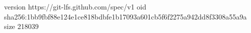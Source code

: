 version https://git-lfs.github.com/spec/v1
oid sha256:1bb9fbf88e124e1ce818bdbfe1b17093a601cb5f6f2275a942dd8f3308a55a9a
size 218039
